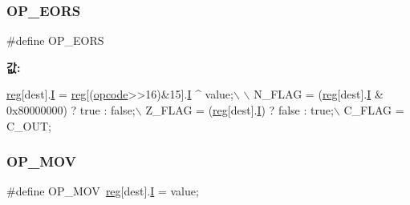 \mbox{\label{_g_b_a_8cpp_ae4b314376e397bf3182aa7def0d7404c}} 
\subsubsection{\texorpdfstring{O\+P\+\_\+\+E\+O\+RS}{OP\_EORS}\hspace{0.1cm}{\footnotesize\ttfamily [2/2]}}
{\footnotesize\ttfamily \#define O\+P\+\_\+\+E\+O\+RS}

{\bfseries 값\+:}
\begin{DoxyCode}
\mbox{\hyperlink{_g_b_a_8h_ae29faba89509024ffd1a292badcedf2d}{reg}}[dest].\mbox{\hyperlink{unionreg__pair_a9f6a42d56c07829d7013571eda998252}{I}} = \mbox{\hyperlink{_g_b_a_8h_ae29faba89509024ffd1a292badcedf2d}{reg}}[(\mbox{\hyperlink{arm-new_8h_a4fc220098f4b9d0e039a28274d05c198}{opcode}}>>16)&15].\mbox{\hyperlink{arm-new_8h_a782b7c7c9a56a2031f6270eac7f000d6}{I}} ^ value;\(\backslash\)
      \(\backslash\)
      N\_FLAG = (\mbox{\hyperlink{_g_b_a_8h_ae29faba89509024ffd1a292badcedf2d}{reg}}[dest].\mbox{\hyperlink{unionreg__pair_a9f6a42d56c07829d7013571eda998252}{I}} & 0x80000000) ? \textcolor{keyword}{true} : \textcolor{keyword}{false};\(\backslash\)
      Z\_FLAG = (\mbox{\hyperlink{_g_b_a_8h_ae29faba89509024ffd1a292badcedf2d}{reg}}[dest].\mbox{\hyperlink{unionreg__pair_a9f6a42d56c07829d7013571eda998252}{I}}) ? \textcolor{keyword}{false} : \textcolor{keyword}{true};\(\backslash\)
      C\_FLAG = C\_OUT;
\end{DoxyCode}
\mbox{\label{_g_b_a_8cpp_ad6d5446fd6da89ab6e4babec5135db6f}} 
\subsubsection{\texorpdfstring{O\+P\+\_\+\+M\+OV}{OP\_MOV}\hspace{0.1cm}{\footnotesize\ttfamily [1/2]}}
{\footnotesize\ttfamily \#define O\+P\+\_\+\+M\+OV~\mbox{\hyperlink{_globals_8h_ae29faba89509024ffd1a292badcedf2d}{reg}}\mbox{[}dest\mbox{]}.\mbox{\hyperlink{thumb_8h_a782b7c7c9a56a2031f6270eac7f000d6}{I}} = value;}

\mbox{\label{arm-new_8h_ad6d5446fd6da89ab6e4babec5135db6f}} 
